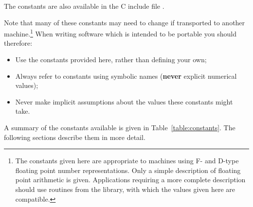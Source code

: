 The constants are also available in the C include file .

Note that many of these constants may need to change if transported to
another machine.\footnote{
The constants given here are appropriate to  machines using F- and
D-type floating point number representations.
Only a simple description of floating point arithmetic is given.
Applications requiring a more complete description should use routines
from the  library, with which the values given here are compatible.}
When writing software which is intended to be portable you should therefore:

\begin{itemize}

\item Use the constants provided here, rather than defining your own;

\item Always refer to constants using symbolic names ({\bf never} explicit
numerical values);

\item Never make implicit assumptions about the values these constants might
take.

\end{itemize}

A summary of the constants available is given in
Table~\ref{table:constants}.
The following sections describe them in more detail.

